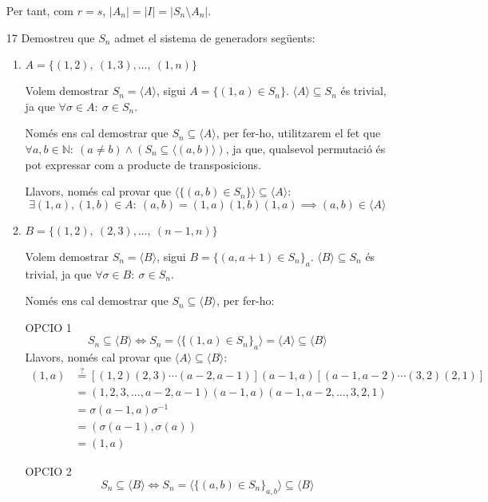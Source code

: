 \documentclass[a4paper, 11pt]{article}
\newcommand{\tq}{:\ }
\begin{document}
\begin{enumerate}
		Per tant, com $r = s$, $|A_n| = |I| = |S_n \setminus A_n|$.

	\item[17] Demostreu que $S_n$ admet el sistema de generadors següents:
		\begin{enumerate}
			\item $A = \{(1,2),\ (1,3), \dotsc ,\ (1,n)\}$\medskip
			
				Volem demostrar $S_n = \langle A\rangle$, sigui $A = \{(1,a) \in S_n\}$. $\langle A\rangle \subseteq S_n$ és trivial, ja que $\forall \sigma \in A \tq \sigma \in S_n$. 
				
				Només ens cal demostrar que $S_n \subseteq \langle A \rangle$, per fer-ho, utilitzarem el fet que $\forall a,b \in \mathbb{N} \tq (a \neq b) \land (S_n \subseteq \langle (a,b) \rangle)$, ja que, qualsevol permutació és pot expressar com a producte de transposicions.

				Llavors, només cal provar que $\langle \{(a,b) \in S_n\} \rangle \subseteq \langle A \rangle$:
				\[\exists (1,a), (1,b) \in A \tq (a,b) = (1,a)(1,b)(1,a) \implies (a,b) \in \langle A \rangle\]

			\item $B = \{(1,2),\ (2,3), \dotsc ,\ (n-1,n)\}$\medskip
				
				Volem demostrar $S_n = \langle B \rangle$, sigui $B = \{(a,a+1) \in S_n\}_a$. $\langle B \rangle \subseteq S_n$ és trivial, ja que $\forall \sigma \in B \tq \sigma \in S_n$.
				
				Només ens cal demostrar que $S_n \subseteq \langle B \rangle$, per fer-ho:

				OPCIO 1
				\[S_n \subseteq \langle B \rangle \iff S_n = \langle \{(1,a) \in S_n\}_a \rangle = \langle A \rangle \subseteq \langle B \rangle\] 
				Llavors, només cal provar que $\langle A \rangle \subseteq \langle B \rangle$:
				\[\begin{aligned}
					(1,a) & \overset{?}{=} [(1,2)(2,3) \cdots (a-2,a-1)] (a-1, a) [(a-1,a-2) \cdots (3,2)(2,1)] \\
					& = (1, 2, 3, \dotsc , a-2, a-1) (a-1, a) (a-1, a-2, \dotsc , 3, 2, 1) \\
					& = \sigma (a-1, a) \sigma^{-1} \\
					& = (\sigma (a-1), \sigma (a)) \\
					& = (1,a)
				\end{aligned}\]

				OPCIO 2
				\[S_n \subseteq \langle B \rangle \iff S_n = \langle \{(a,b) \in S_n\}_{a, b} \rangle \subseteq \langle B \rangle\]


\end{enumerate}
\end{enumerate}
\end{document}
